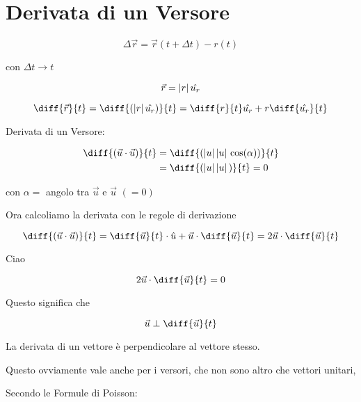 \section{Derivata di un Versore}

\begin{equation}
  \Delta \vec{r} = \vec{r}(t + \Delta t) - r(t)
\end{equation}

con $\Delta t \rightarrow t$

$$ \vec{r} = \abs*{r} \hat{u_r} $$

\begin{equation}
  \diff{\vec{r}}{t} = \diff{(\abs*{r} \hat{u_r})}{t} = \diff{r}{t} \hat{u_r} + r \diff{\hat{u_r}}{t}
\end{equation}

Derivata di un Versore:

\begin{equation}
  \begin{split}
    \diff{(\vec{u} \cdot \vec{u})}{t} &= \diff{(\abs*{u} \abs*{u} \cos(\alpha))}{t} \\
    & = \diff{(\abs*{u} \abs*{u})}{t} = 0
  \end{split}
\end{equation}

con $\alpha = $ angolo tra $\vec{u}$ e $\vec{u}$ $(=0)$

Ora calcoliamo la derivata con le regole di derivazione

\begin{equation}
  \diff{(\vec{u} \cdot \vec{u})}{t} = \diff{\vec{u}}{t} \cdot \hat{u} + \vec{u} \cdot \diff{\vec{u}}{t}
  = 2 \vec{u} \cdot \diff{\vec{u}}{t}
\end{equation}

Ciao

\begin{equation}
  2 \vec{u} \cdot \diff{\vec{u}}{t} = 0
\end{equation}

Questo significa che

\begin{equation}
  \vec{u} \perp \diff{\vec{u}}{t}
\end{equation}

La derivata di un vettore è perpendicolare al vettore stesso.

Questo ovviamente vale anche per i versori, che non sono altro che vettori unitari,

Secondo le Formule di Poisson:

